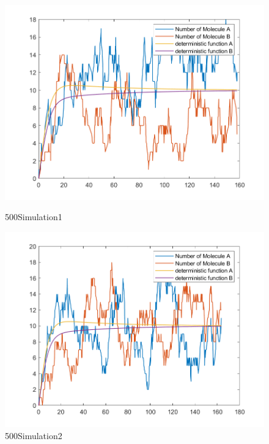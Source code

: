 \documentclass{article}
\begin{document}
\begin{figure}[htbp]
    \centering
    \begin{minipage}{0.45\linewidth}
        \centering
        \includegraphics[width=\linewidth]{graph/a1.png}
        \caption{500Simulation1}
        \label{a1}
    \end{minipage}
    \hfill
    \begin{minipage}{0.45\linewidth}
        \centering
        \includegraphics[width=\linewidth]{graph/a2.png}
        \caption{500Simulation2}
        \label{a2}
    \end{minipage}
\end{figure}
\end{document}
